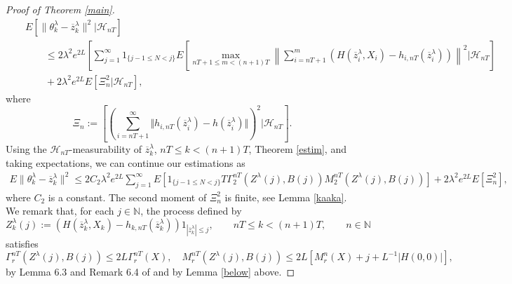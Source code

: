 \documentclass[a4paper]{article}
\begin{document}
\begin{proof}[ Proof of Theorem \ref{main}]
\begin{eqnarray*}
	&&E\left[\|\theta^{\lambda}_{k}-\overline{z}_{k}^{\lambda}\|^2 \vert\mathcal{H}_{nT}\right] \\
	&& \qquad \leq2\lambda^2 e^{2L} \left[\sum_{j=1}^{\infty}1_{\{j-1\leq N <j\}}
	E\left[\max_{nT+1\leq m<(n+1)T} \left\|\sum_{i=nT+1}^m \left(H(\overline{z}_i^{\lambda},X_i)-
	h_{i,nT}(\overline{z}_i^{\lambda})\right)\right\|^2 \vert\mathcal{H}_{nT}\right]\right. \\
	&& \qquad+  2\lambda^2 e^{2L} E\left[\Xi_n^2 \vert\mathcal{H}_{nT}\right],
\end{eqnarray*}
where 
$$ \Xi_n := \left[\left(\sum_{i=nT+1}^{\infty} \Vert h_{i,nT}(\overline{z}_i^{\lambda})-
h(\overline{z}_i^{\lambda})\Vert\right)^2\vert\mathcal{H}_{nT}\right].$$
Using the $\mathcal{H}_{nT}$-measurability of $\overline{z}^{\lambda}_k$,
$nT\leq k<(n+1)T$, Theorem \ref{estim}, %
and taking expectations, we can continue our estimations as
\begin{eqnarray*}
	E\| \theta^{\lambda}_{k}-\overline{z}^{\lambda}_{k}\|^2 \leq
	2C_2\lambda^2 e^{2L}\sum_{j=1}^{\infty}E[1_{\{j-1\leq N <j\}}
	T\Gamma_2^{nT}(Z^{\lambda}(j),B(j))M_2^{nT}(Z^{\lambda}(j),B(j))] +	2\lambda^2 e^{2L}
	E\left[\Xi^2_{n}\right],
\end{eqnarray*}
where $C_2$ is a constant. The second moment of $\Xi^2_{n}$ is finite, see Lemma \ref{kaaka}.	
We remark that, for each $j\in\mathbb{N}$, the process defined by
\begin{equation}\label{Z}
Z_k^{\lambda}(j):=(H(\overline{z}_k^{\lambda},X_k)-h_{k,nT}(\overline{z}_k^{\lambda}))1_{|\overline{z}^{\lambda}_k|\leq j}, \qquad nT\leq k<(n+1)T, \qquad n\in\mathbb{N}
\end{equation}
satisfies
\begin{equation}\label{wq}
\Gamma^{nT}_r(Z^{\lambda}(j),B(j))\leq 2L\Gamma^{nT}_r(X),\quad
M^{nT}_r(Z^{\lambda}(j),B(j))\leq 2L[M_r^n(X)+j+L^{-1}|H(0,0)|],
\end{equation}
by Lemma 6.3 and Remark 6.4 of \cite{4} and by Lemma \ref{below} above.
	

\end{proof}
\end{document}
